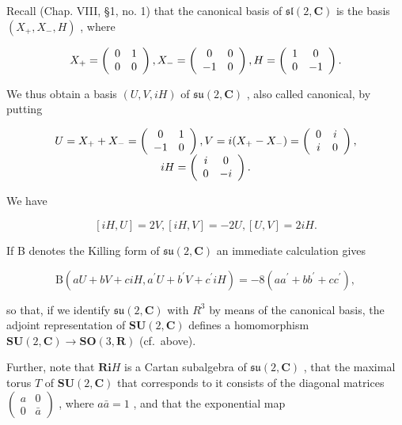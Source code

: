 Recall (Chap. VIII, §1, no. 1) that the canonical basis of \(\mathfrak{sl}(2,\mathbf{C})\) is the basis \((X_{+},X_{-},H)\) , where

\[
X _ {+} = \left( \begin{array}{c c} 0 & 1 \\ 0 & 0 \end{array} \right), X _ {-} = \left( \begin{array}{c c} 0 & 0 \\ - 1 & 0 \end{array} \right), H = \left( \begin{array}{c c} 1 & 0 \\ 0 & - 1 \end{array} \right).
\]

We thus obtain a basis \((U, V, iH)\) of \(\mathfrak{su}(2, \mathbf{C})\) , also called canonical, by putting

\[
\begin{array}{c} U = X _ {+} + X _ {-} = \left( \begin{array}{c c} 0 & 1 \\ - 1 & 0 \end{array} \right), V = i (X _ {+} - X _ {-}) = \left( \begin{array}{c c} 0 & i \\ i & 0 \end{array} \right), \\ i H = \left( \begin{array}{c c} i & 0 \\ 0 & - i \end{array} \right). \end{array}
\]

We have

\[
[ i H, U ] = 2 V, [ i H, V ] = - 2 U, [ U, V ] = 2 i H.\tag{13}
\]

If B denotes the Killing form of \(\mathfrak{su}(2,\mathbf{C})\) an immediate calculation gives

\[
\mathrm{B} (a U + b V + c i H, a ^ {\prime} U + b ^ {\prime} V + c ^ {\prime} i H) = - 8 (a a ^ {\prime} + b b ^ {\prime} + c c ^ {\prime}),\tag{14}
\]

so that, if we identify \(\mathfrak{su}(2,\mathbf{C})\) with \(R^{3}\) by means of the canonical basis, the adjoint representation of \(\mathbf{SU}(2,\mathbf{C})\) defines a homomorphism \(\mathbf{SU}(2,\mathbf{C})\to\mathbf{SO}(3,\mathbf{R})\) (cf.~above).

Further, note that \(\mathbf{Ri}H\) is a Cartan subalgebra of \(\mathfrak{su}(2,\mathbf{C})\) , that the maximal torus \(T\) of \(\mathbf{SU}(2,\mathbf{C})\) that corresponds to it consists of the diagonal matrices \(\left( \begin{array}{cc}a & 0\\ 0 & \bar{a} \end{array} \right)\) , where \(a\bar{a} = 1\) , and that the exponential map

